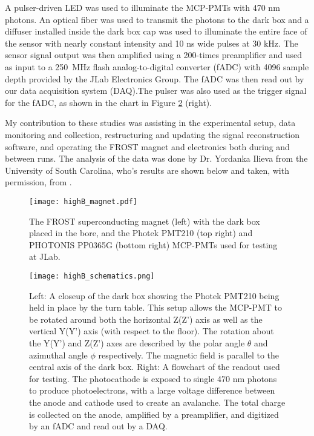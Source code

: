 A pulser-driven LED was used to illuminate the MCP-PMTs with 470 nm photons. An optical fiber was used to transmit the photons to the dark box and a diffuser installed inside the dark box cap was used to illuminate the entire face of the sensor with nearly constant intensity and 10 ns wide pulses at 30 kHz. The sensor signal output was then amplified using a 200-times preamplifier and used as input to a 250~MHz flash analog-to-digital converter (fADC) with 4096 sample depth provided by the JLab Electronics Group. The fADC was then read out by our data acquisition system (DAQ).The pulser was also used as the trigger signal for the fADC, as shown in the chart in Figure \ref{fig:highB_schematics} (right).

My contribution to these studies was assisting in the experimental setup, data monitoring and collection, restructuring and updating the signal reconstruction software, and operating the FROST magnet and electronics both during and between runs. The analysis of the data was done by Dr. Yordanka Ilieva from the University of South Carolina, who's results are shown below and taken, with permission, from \cite{HighB_DIRC2015}.


\begin{figure}[!htb]
	\centering
	\texttt{[image: highB\_magnet.pdf]}
	\caption{The FROST superconducting magnet (left) with the dark box placed in the bore, and the Photek PMT210 (top right) and PHOTONIS PP0365G (bottom right) MCP-PMTs used for testing at JLab.}
	\label{fig:highB_magnet}
\end{figure}

\begin{figure}[!htb]
	\centering
	\texttt{[image: highB\_schematics.png]}
	\caption{Left: A closeup of the dark box showing the Photek PMT210 being held in place by the turn table. This setup allows the MCP-PMT to be rotated around both the horizontal Z(Z') axis as well as the vertical Y(Y') axis (with respect to the floor). The rotation about the Y(Y') and Z(Z') axes are described by the polar angle $\theta$ and azimuthal angle $\phi$ respectively. The magnetic field is parallel to the central axis of the dark box. Right: A flowchart of the readout used for testing. The photocathode is exposed to single 470 nm photons to produce photoelectrons, with a large voltage difference between the anode and cathode used to create an avalanche. The total charge is collected on the anode, amplified by a preamplifier, and digitized by an fADC and read out by a DAQ. \cite{HighB_DIRC2015} }
	\label{fig:highB_schematics}
\end{figure}

